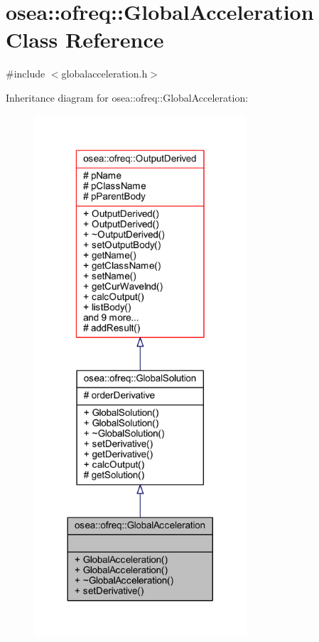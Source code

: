 \hypertarget{classosea_1_1ofreq_1_1_global_acceleration}{\section{osea\-:\-:ofreq\-:\-:Global\-Acceleration Class Reference}
\label{classosea_1_1ofreq_1_1_global_acceleration}
}


{\ttfamily \#include $<$globalacceleration.\-h$>$}



Inheritance diagram for osea\-:\-:ofreq\-:\-:Global\-Acceleration\-:
\nopagebreak
\begin{figure}[H]
\begin{center}
\leavevmode
\includegraphics[height=550pt]{classosea_1_1ofreq_1_1_global_acceleration__inherit__graph}
\end{center}
\end{figure}
